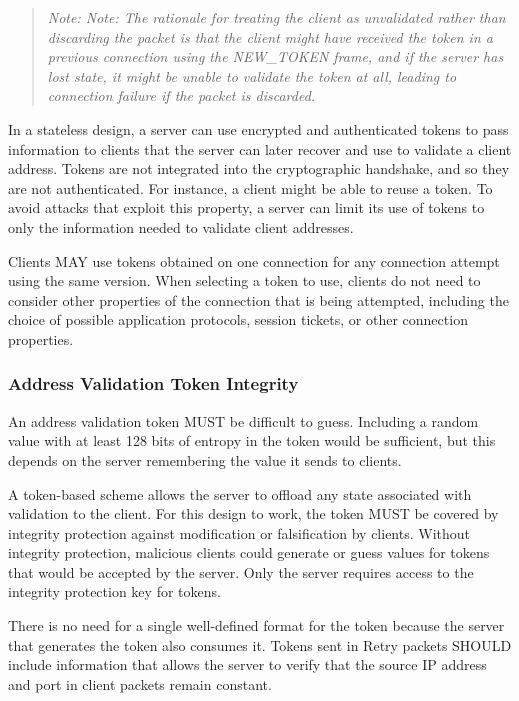 \documentclass{article}
\begin{document}
\begin{quote}
\textit{Note: Note: The rationale for treating the client as unvalidated rather than discarding the packet is that the client might have received the token in a previous connection using the NEW\_TOKEN frame, and if the server has lost state, it might be unable to validate the token at all, leading to connection failure if the packet is discarded.}
\end{quote}

In a stateless design, a server can use encrypted and authenticated tokens to pass information to clients that the server can later recover and use to validate a client address.  Tokens are not integrated into the cryptographic handshake, and so they are not authenticated.  For instance, a client might be able to reuse a token.  To avoid attacks that exploit this property, a server can limit its use of tokens to only the information needed to validate client addresses.

Clients MAY use tokens obtained on one connection for any connection attempt using the same version.  When selecting a token to use, clients do not need to consider other properties of the connection that is being attempted, including the choice of possible application protocols, session tickets, or other connection properties.

\subsubsection{Address Validation Token Integrity}

An address validation token MUST be difficult to guess.  Including a random value with at least 128 bits of entropy in the token would be sufficient, but this depends on the server remembering the value it sends to clients.

A token-based scheme allows the server to offload any state associated with validation to the client.  For this design to work, the token MUST be covered by integrity protection against modification or falsification by clients.  Without integrity protection, malicious clients could generate or guess values for tokens that would be accepted by the server.  Only the server requires access to the integrity protection key for tokens.

There is no need for a single well-defined format for the token because the server that generates the token also consumes it.  Tokens sent in Retry packets SHOULD include information that allows the server to verify that the source IP address and port in client packets remain constant.
\end{document}
